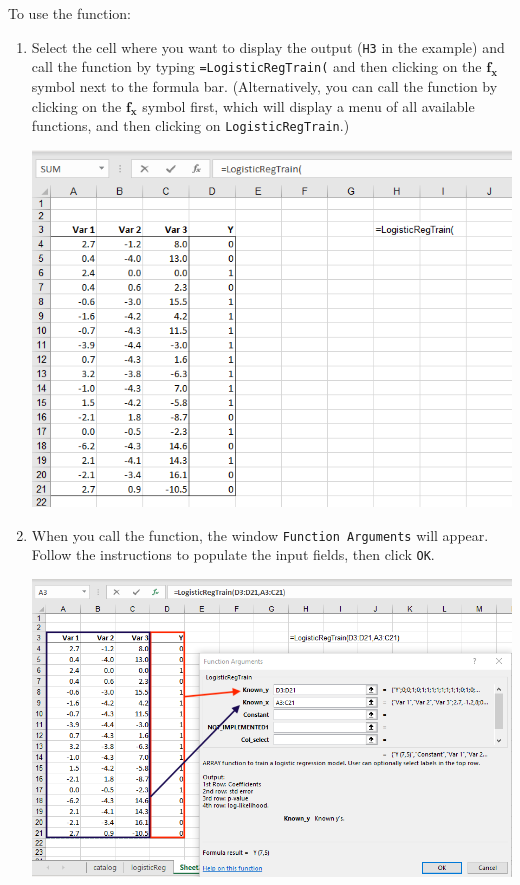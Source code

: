 \documentclass[12pt]{article}
\begin{document}
To use the function:
\begin{enumerate}
\item Select the cell where you want to display the output (\texttt{H3} in the example) and call the function by typing \texttt{=LogisticRegTrain(} and then clicking on the $\boldsymbol{f_x}$ symbol next to the formula bar. (Alternatively, you can call the function by clicking on the  $\boldsymbol{f_x}$ symbol first, which will display a menu of all available functions, and then clicking on \texttt{LogisticRegTrain}.)

\medskip

\centerline{\includegraphics[width=6in]{figures/LogRegTrain1}}

\medskip

\item When you call the function, the window \texttt{Function Arguments} will appear. Follow the instructions to populate the input fields, then click \texttt{OK}.

\medskip

\centerline{\includegraphics[width=6in]{figures/LogRegTrain2}}


\end{enumerate}
\end{document}
